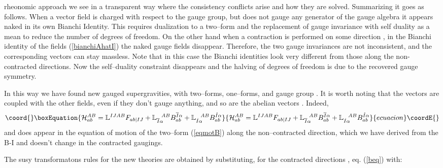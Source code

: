 \documentclass[a4paper,12pt]{article}
\def\bar{\overline}\end {picture}}
\begin{document}
rheonomic approach we  see in a transparent way where the
consistency conflicts arise and how they are solved. Summarizing
it goes as follows. When a vector field is charged with respect to
the gauge group, but does not gauge any generator of the gauge
algebra it appears naked in its own Bianchi Identity. This
requires dualization to a two--form and the replacement of gauge
invariance with self duality as a mean to reduce the number of
degrees of freedom. On the other hand  when a contraction is
performed on some direction \coordHE{}, in the Bianchi identity of
the fields \coordHE{} (\ref{bianchiAhatI}) the naked
gauge fields disappear. Therefore, the two gauge invariances are
not inconsistent, and the corresponding vectors can stay massless.
Note that in this case the Bianchi identities look very different
from those along the non-contracted directions. Now the
self--duality constraint disappears and the halving of degrees of
freedom is due to the recovered \coordHE{} gauge symmetry.
\par
In this way we have found new gauged \coordHE{}
supergravities, with \coordHE{} two--forms, \coordHE{} one--forms, and
gauge group \coordHE{}. It is worth noting
that the \coordHE{} vectors \coordHE{} are coupled with the
other fields, even if they don't gauge anything, and so are the
abelian  vectors \coordHE{}. Indeed,
\begin{equation}\coord{}\boxEquation{
\mathcal{H}^{AB}_{ab}=\mathbb{L}^{IJAB}F_{ab\vert IJ}+
\mathbb{L}_{\bar{I}\alpha}^{~~AB}B^{\bar{I}\alpha}_{ab}+
\mathbb{L}_{\hat{I}\alpha}^{~~AB}B^{\hat{I}\alpha}_{ab}
}{
\mathcal{H}^{AB}_{ab}=\mathbb{L}^{IJAB}F_{ab\vert IJ}+
\mathbb{L}_{\bar{I}\alpha}^{~~AB}B^{\bar{I}\alpha}_{ab}+
\mathbb{L}_{\hat{I}\alpha}^{~~AB}B^{\hat{I}\alpha}_{ab}
}{ecuacion}\coordE{}\end{equation}
and \coordHE{} does appear in the equation of motion
of the two--form (\ref{eqmotB}) along the non--contracted
direction, which we have derived from the B-I and doesn't change
in the contracted gaugings.
\par
The susy transformatons rules for the new theories are obtained by
substituting, for the contracted directions \coordHE{}, eq.
(\ref{beq}) with:
\end{document}
